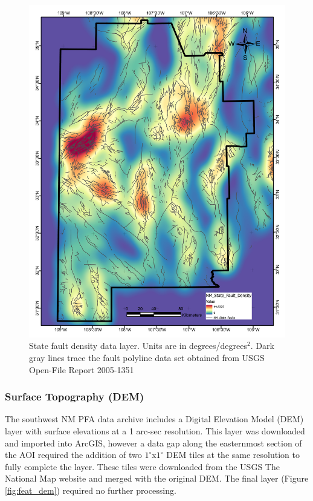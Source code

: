 \begin{figure}[!htp]
\centering
\includegraphics[scale=.50]{templates/images/Figure-StateFaultDensity.pdf}
\caption[State fault density data layer]{State fault density data layer. Units are in degrees/degrees$^2$. Dark gray lines trace the fault polyline data set obtained from USGS Open-File Report 2005-1351 \protect\citep{stoeser_usgs_2005}}
\label{fig:state_faults}
\end{figure}

\subsubsection{Surface Topography (DEM)}

The southwest NM PFA data archive \citep{kelley_geothermal_2015} includes a Digital Elevation Model (DEM) layer with surface elevations at a 1 arc-sec resolution. This layer was downloaded and imported into ArcGIS, however a data gap along the easternmost section of the AOI required the addition of two $1^\circ$x$1^\circ$ DEM tiles at the same resolution to fully complete the layer. These tiles were downloaded from the USGS The National Map website \citep{usgs_tnm_2021} and merged with the original DEM. The final layer (Figure \ref{fig:feat_dem}) required no further processing.

